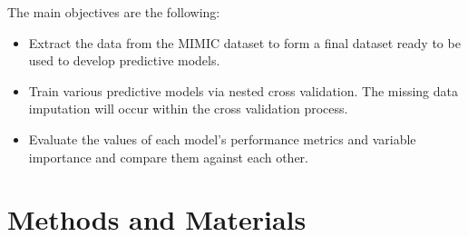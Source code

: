 \documentclass[11pt]{article}
\begin{document}
The main objectives are the following:
\begin{itemize}
    \item Extract the data from the MIMIC dataset to form a final dataset ready to be used to develop predictive models.
    \item Train various predictive models via nested cross validation. The missing data imputation will occur within the cross validation process.
    \item Evaluate the values of each model's performance metrics and variable importance and compare them against each other.
\end{itemize}

\newpage

\section{Methods and Materials}
\end{document}
